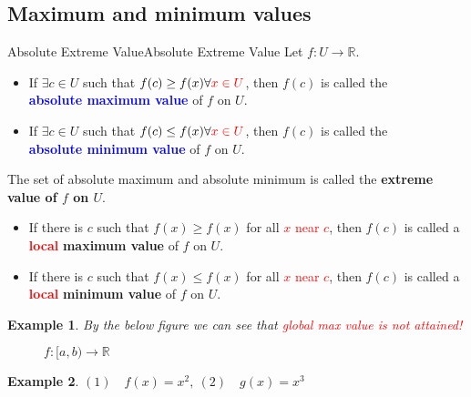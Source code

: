 \documentclass[12pt,a4paper]{article}
\newcommand{\R}{\mathbb{R}}
\theoremstyle{mystyle}
\numberwithin{figure}{subsection}
\newtheorem{exm}{Example}[subsection] %
\newenvironment{ex}{\begin{exBox}\begin{exm}}{\end{exm}\end{exBox}}
\begin{document}
\subsection{Maximum and minimum values}
\begin{df}{Absolute Extreme Value}{Absolute Extreme Value}
Let $f: U \longrightarrow \R.$
\begin{itemize}
    \item If $\exists c \in U$ such that $f(c) \ge f(x) \forall \textcolor{red}{x \in U}$, then $f(c)$ is called the \\ \textcolor{blue}{\textbf{absolute maximum value}} of $f$ on $U$.
    \item If $\exists c \in U$ such that $f(c) \le f(x) \forall \textcolor{red}{x \in U}$, then $f(c)$ is called the \\ \textcolor{blue}{\textbf{absolute minimum value}} of $f$ on $U$.
\end{itemize}
The set of absolute maximum and absolute minimum is called the \textbf{extreme value of $f$ on $U$}.
\begin{itemize}
    \item If there is $c$ such that $f(x) \ge f(x)$ for all \textcolor{red}{$x$ near $c$}, then $f(c)$ is called a \textcolor{red}{\textbf{local}} \textbf{maximum value} of $f$ on $U$.
    \item If there is $c$ such that $f(x) \le f(x)$ for all \textcolor{red}{$x$ near $c$}, then $f(c)$ is called a \textcolor{red}{\textbf{local}} \textbf{minimum value} of $f$ on $U$.
\end{itemize}
\end{df}
\begin{ex}
By the below figure we can see that \textcolor{red}{global max value is not attained!}
\end{ex}
\begin{figure}[h]
    \centering
    
    \caption{$f:[a,b) \longrightarrow \R$}
    \label{fig:4.1.1}
\end{figure}
\begin{ex}
$(1) \quad f(x) = x^2, \ (2) \quad g(x) = x^3$
\end{ex}
\begin{figure}[h]
    \centering
    \centering
\end{figure}
\end{document}
